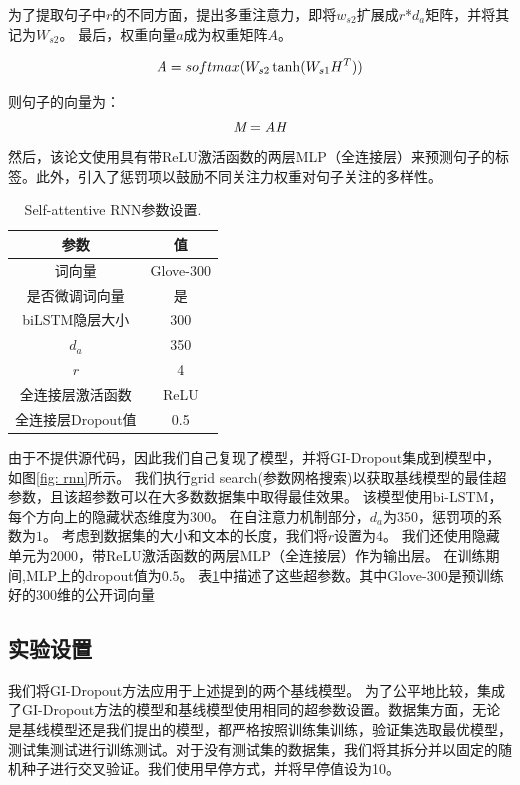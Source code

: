 为了提取句子中$r$的不同方面，\cite{lin2017structured}提出多重注意力，即将$w_{s2}$扩展成$r$*$d_{a}$矩阵，并将其记为$W_{s2}$。
最后，权重向量$a$成为权重矩阵$A$。

\begin{equation}
\emph{A} = softmax(W_{s2}\tanh(W_{s1}H^T))
\end{equation}

则句子的向量为：
\begin{equation}
\emph{M} = \emph{A}\emph{H}
\end{equation}
然后，该论文使用具有带ReLU激活函数的两层MLP（全连接层）来预测句子的标签。此外，引入了惩罚项以鼓励不同关注力权重对句子关注的多样性。

\begin{table}[!t]
\centering
\begin{tabular}{c c}
\hline
\bfseries 参数 & \bfseries 值\\
\hline
词向量 & Glove-300 \\
是否微调词向量 & 是\\
biLSTM隐层大小 & 300 \\
$d_{a}$ & 350 \\
$r$ & 4 \\
全连接层激活函数 & ReLU \\
全连接层Dropout值 & 0.5 \\
\hline
\end{tabular}
\caption{Self-attentive RNN参数设置.}
\label{table: self-attention baseline hyperparameters}
\end{table}

由于不提供源代码，因此我们自己复现了模型，并将GI-Dropout集成到模型中，如图\ref{fig: rnn}所示。
我们执行grid search(参数网格搜索)以获取基线模型的最佳超参数，且该超参数可以在大多数数据集中取得最佳效果。
该模型使用bi-LSTM，每个方向上的隐藏状态维度为$300$。
在自注意力机制部分，$d_a$为$350$，惩罚项的系数为$1$。
考虑到数据集的大小和文本的长度，我们将$r$设置为$4$。
我们还使用隐藏单元为2000，带ReLU激活函数的两层MLP（全连接层）作为输出层。
在训练期间,MLP上的dropout值为$0.5$。
表\ref{table: self-attention baseline hyperparameters}中描述了这些超参数。其中Glove-300是预训练好的300维的公开词向量\citep{pennington2014glove}


\subsection{实验设置}
我们将GI-Dropout方法应用于上述提到的两个基线模型。
为了公平地比较，集成了GI-Dropout方法的模型和基线模型使用相同的超参数设置。数据集方面，无论是基线模型还是我们提出的模型，都严格按照训练集训练，验证集选取最优模型，测试集测试进行训练测试。对于没有测试集的数据集，我们将其拆分并以固定的随机种子进行交叉验证。我们使用早停方式，并将早停值设为10。

